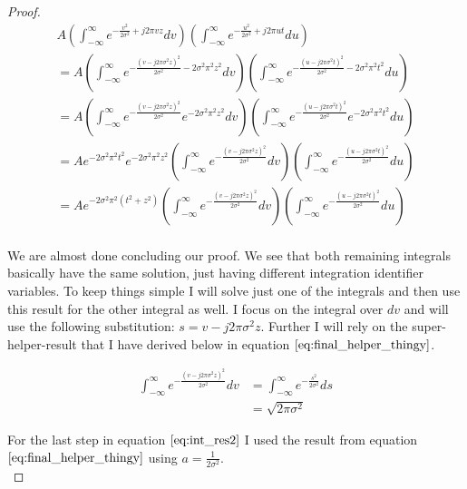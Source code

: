 \documentclass{paper}
\begin{document}
\begin{proof}
\begin{align}
A \left(\int_{-\infty}^{\infty} e^{-\frac{v^2}{2 \sigma^2} + j 2 \pi vz} dv \right) \left( \int_{-\infty}^{\infty} e^{-\frac{u^2}{2 \sigma^2} + j 2 \pi ut} du \right) \\
= 
A \left(\int_{-\infty}^{\infty} e^{-\frac{(v - j 2 \pi \sigma^2 z)^2}{2 \sigma^2} - 2\sigma^2 \pi^2 z^2} dv \right) \left( \int_{-\infty}^{\infty} e^{-\frac{(u - j 2 \pi \sigma^2 t)^2}{2 \sigma^2} - 2\sigma^2 \pi^2 t^2} du \right) \\
=
A \left(\int_{-\infty}^{\infty} e^{-\frac{(v - j 2 \pi \sigma^2 z)^2}{2 \sigma^2}} e^{- 2\sigma^2 \pi^2 z^2} dv \right) \left( \int_{-\infty}^{\infty} e^{-\frac{(u - j 2 \pi \sigma^2 t)^2}{2 \sigma^2}} e^{- 2\sigma^2 \pi^2 t^2} du \right) \\
=
A e^{- 2\sigma^2 \pi^2 t^2} e^{- 2\sigma^2 \pi^2 z^2} \left(\int_{-\infty}^{\infty} e^{-\frac{(v - j 2 \pi \sigma^2 z)^2}{2 \sigma^2}} dv \right) \left( \int_{-\infty}^{\infty} e^{-\frac{(u - j 2 \pi \sigma^2 t)^2}{2 \sigma^2}} du \right) \\
=
A e^{- 2\sigma^2 \pi^2 (t^2 + z^2)} \left(\int_{-\infty}^{\infty} e^{-\frac{(v - j 2 \pi \sigma^2 z)^2}{2 \sigma^2}} dv \right) \left( \int_{-\infty}^{\infty} e^{-\frac{(u - j 2 \pi \sigma^2 t)^2}{2 \sigma^2}} du \right) \\
\label{eq:second_res}
\end{align}

We are almost done concluding our proof. We see that both remaining integrals basically have the same solution, just having different integration identifier variables. To keep things simple I will solve just one of the integrals and then use this result for the other integral as well. I focus on the integral over $dv$ and will use the following substitution: $s = v - j 2 \pi \sigma^2 z$. Further I will rely on the super-helper-result that I have derived below in equation $\ref{eq:final_helper_thingy}$.

\begin{align}
    \int_{-\infty}^{\infty} e^{-\frac{(v - j 2 \pi \sigma^2 z)^2}{2 \sigma^2}} dv
    &= \int_{-\infty}^{\infty} e^{-\frac{s^2}{2 \sigma^2}} ds \\
    &= \sqrt{2\pi \sigma^2}
\label{eq:int_res2}
\end{align}

For the last step in equation $\ref{eq:int_res2}$ I used the result from equation $\ref{eq:final_helper_thingy}$ using $a = \frac{1}{2\sigma^2}$. \\


\end{proof}
\end{document}
